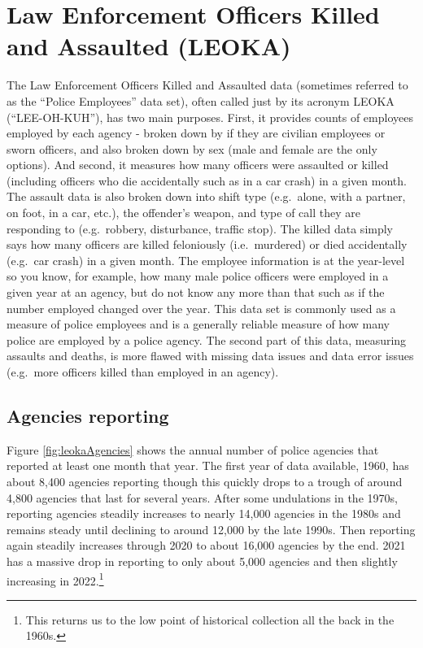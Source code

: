 \documentclass[
]{krantz}
\begin{document}
\chapter{Law Enforcement Officers Killed and Assaulted
(LEOKA)}\label{leoka}

The Law Enforcement Officers Killed and Assaulted data
(sometimes referred to as the ``Police Employees'' data set),
often called just by its acronym LEOKA (``LEE-OH-KUH''), has
two main purposes. First, it provides counts of employees
employed by each agency - broken down by if they are
civilian employees or sworn officers, and also broken down
by sex (male and female are the only options). And second,
it measures how many officers were assaulted or killed
(including officers who die accidentally such as in a car
crash) in a given month. The assault data is also broken
down into shift type (e.g.~alone, with a partner, on foot,
in a car, etc.), the offender's weapon, and type of call
they are responding to (e.g.~robbery, disturbance, traffic
stop). The killed data simply says how many officers are
killed feloniously (i.e.~murdered) or died accidentally
(e.g.~car crash) in a given month. The employee information
is at the year-level so you know, for example, how many male
police officers were employed in a given year at an agency,
but do not know any more than that such as if the number
employed changed over the year. This data set is commonly
used as a measure of police employees and is a generally
reliable measure of how many police are employed by a police
agency. The second part of this data, measuring assaults and
deaths, is more flawed with missing data issues and data
error issues (e.g.~more officers killed than employed in an
agency).

\section{Agencies reporting}\label{agencies-reporting-3}

Figure \ref{fig:leokaAgencies} shows the annual number of
police agencies that reported at least one month that year.
The first year of data available, 1960, has about 8,400
agencies reporting though this quickly drops to a trough of
around 4,800 agencies that last for several years. After
some undulations in the 1970s, reporting agencies steadily
increases to nearly 14,000 agencies in the 1980s and remains
steady until declining to around 12,000 by the late 1990s.
Then reporting again steadily increases through 2020 to
about 16,000 agencies by the end. 2021 has a massive drop in
reporting to only about 5,000 agencies and then slightly
increasing in 2022.\footnote{This returns us to the low
  point of historical collection all the back in the 1960s.}
\end{document}
